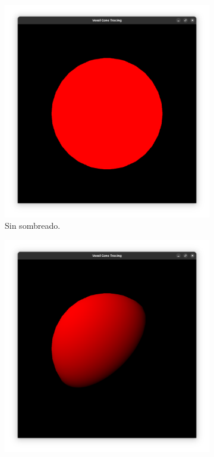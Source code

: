 \begin{figure}
    \begin{center}
    \begin{subfigure}{.49\textwidth}
        \includegraphics[width=\textwidth]{sphere-unshaded.png}
        \caption{Sin sombreado.}
    \end{subfigure}
    \begin{subfigure}{.49\textwidth}
        \includegraphics[width=\textwidth]{sphere-diffuse.png}

\end{subfigure}
\end{center}
\end{figure}
